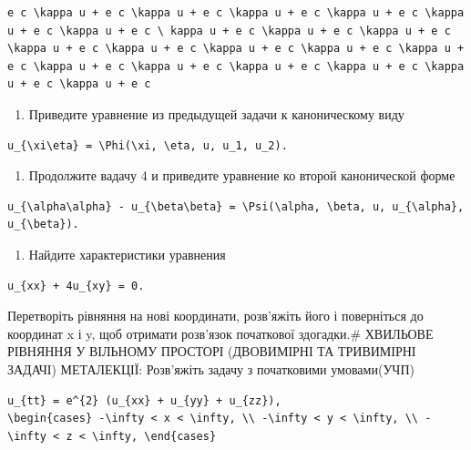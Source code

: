 \documentclass[
  ukrainian,
]{article}
\providecommand{\tightlist}{%
  \setlength{\itemsep}{0pt}\setlength{\parskip}{0pt}}
\begin{document}
\begin{verbatim}
e c \kappa u + e c \kappa u + e c \kappa u + e c \kappa u + e c \kappa u + e c \kappa u + e c \ kappa u + e c \kappa u + e c \kappa u + e c \kappa u + e c \kappa u + e c \kappa u + e c \kappa u + e c \kappa u + e c \kappa u + e c \kappa u + e c \kappa u + e c \kappa u + e c \kappa u + e c \kappa u + e c
\end{verbatim}

\begin{enumerate}
\def\labelenumi{\arabic{enumi}.}
\setcounter{enumi}{3}
\tightlist
\item
  Приведите уравнение из предыдущей задачи к каноническому виду
\end{enumerate}

\begin{verbatim}
u_{\xi\eta} = \Phi(\xi, \eta, u, u_1, u_2).
\end{verbatim}

\begin{enumerate}
\def\labelenumi{\arabic{enumi}.}
\setcounter{enumi}{4}
\tightlist
\item
  Продолжите вадачу 4 и приведите уравнение ко второй канонической форме
\end{enumerate}

\begin{verbatim}
u_{\alpha\alpha} - u_{\beta\beta} = \Psi(\alpha, \beta, u, u_{\alpha}, u_{\beta}).
\end{verbatim}

\begin{enumerate}
\def\labelenumi{\arabic{enumi}.}
\setcounter{enumi}{5}
\tightlist
\item
  Найдите характеристики уравнения
\end{enumerate}

\begin{verbatim}
u_{xx} + 4u_{xy} = 0.
\end{verbatim}

Перетворіть рівняння на нові координати, розв'яжіть його і поверніться
до координат x і y, щоб отримати розв'язок початкової здогадки.\#
ХВИЛЬОВЕ РІВНЯННЯ У ВІЛЬНОМУ ПРОСТОРІ (ДВОВИМІРНІ ТА ТРИВИМІРНІ ЗАДАЧІ)
МЕТАЛЕКЦІЇ: Розв'яжіть задачу з початковими умовами(УЧП)

\begin{verbatim}
u_{tt} = e^{2} (u_{xx} + u_{yy} + u_{zz}),
\begin{cases} -\infty < x < \infty, \\ -\infty < y < \infty, \\ -\infty < z < \infty, \end{cases}
\end{verbatim}
\end{document}
